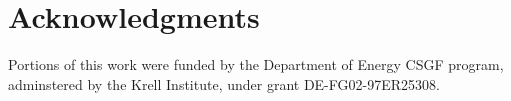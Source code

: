 \documentclass{mc2015}
\begin{document}
\section{Acknowledgments}

Portions of this work were funded by the Department of Energy CSGF program, adminstered by the Krell Institute, under grant DE-FG02-97ER25308.

\setlength{\baselineskip}{12pt}




%
%
\end{document}

